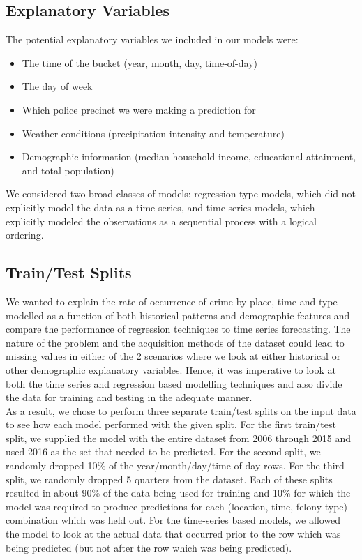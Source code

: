 \documentclass[10pt,journal,compsoc]{IEEEtran}
\begin{document}
\subsection{Explanatory Variables}
The potential explanatory variables we included in our models were:
\begin{itemize}
 \item The time of the bucket (year, month, day, time-of-day)
 \item The day of week
 \item Which police precinct we were making a prediction for
 \item Weather conditions (precipitation intensity and temperature)
 \item Demographic information (median household income, educational attainment,
and total population)
\end{itemize}
We considered two broad classes of models: regression-type models, which did not
explicitly model the data as a time series, and time-series models, which explicitly
modeled the observations as a sequential process with a logical ordering.
\subsection{Train/Test Splits}
We wanted to explain the rate of occurrence of crime by place, time and type modelled
as a function of both historical patterns and demographic features and compare the
performance of regression techniques to time series forecasting. The nature of the
problem and the acquisition methods of the dataset could lead to missing values in
either of the 2 scenarios where we look at either historical or other demographic
explanatory variables. Hence, it was imperative to look at both the time series and
regression based modelling techniques and also divide the data for training and testing
in the adequate manner.\\

As a result, we chose to perform three separate train/test splits on the input data to see how each model performed with the given split. For the first train/test split, we supplied the model with the entire dataset from 2006 through 2015 and used 2016 as the set that needed to be predicted. For the second split, we randomly dropped 10\% of the
year/month/day/time-of-day rows. For the third split, we randomly dropped 5 quarters
from the dataset. Each of these splits resulted in about 90\% of the data being used for
training and 10\% for which the model was required to produce predictions for each
(location, time, felony type) combination which was held out. For the time-series based
models, we allowed the model to look at the actual data that occurred prior to the row
which was being predicted (but not after the row which was being predicted).\\
\end{document}
